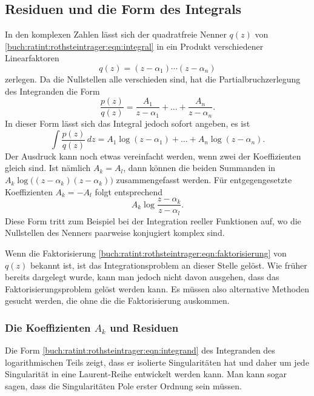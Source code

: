 %
%
\subsection{Residuen und die Form des Integrals
\label{buch:ratint:rothsteintrager:subsection:residuen}}
In den komplexen Zahlen lässt sich der quadratfreie Nenner $q(z)$ von
\eqref{buch:ratint:rothsteintrager:eqn:integral}
in ein Produkt verschiedener Linearfaktoren
\begin{equation}
q(z)
=
(z-\alpha_1)\cdots(z-\alpha_n)
\label{buch:ratint:rothsteintrager:eqn:faktorisierung}
\end{equation}
zerlegen.
Da die Nullstellen alle verschieden sind, hat die Partialbruchzerlegung
des Integranden die Form
\begin{equation}
\frac{p(z)}{q(z)}
=
\frac{A_1}{z-\alpha_1}
+
\ldots
+
\frac{A_n}{z-\alpha_n}.
\label{buch:ratint:rothsteintrager:eqn:integrand}
\end{equation}
In dieser Form lässt sich das Integral jedoch sofort angeben, es ist
\begin{equation}
\int
\frac{p(z)}{q(z)}
\,dz
=
A_1\log(z-\alpha_1)
+
\ldots
+
A_n\log(z-\alpha_n).
\label{buch:ratint:rothsteintrager:eqn:integralform}
\end{equation}
Der Ausdruck kann noch etwas vereinfacht werden, wenn zwei der
Koeffizienten gleich sind.
Ist nämlich $A_k=A_l$, dann können die beiden Summanden in
$A_k\log\bigl((z-\alpha_k)(z-\alpha_k)\bigr)$
zusammengefasst werden.
Für entgegengesetzte Koeffizienten $A_k=-A_l$ folgt entsprechend
\[
A_k\log \frac{z-\alpha_k}{z-\alpha_l}.
\]
Diese Form tritt zum Beispiel bei der Integration reeller Funktionen
auf, wo die Nullstellen des Nenners paarweise konjugiert komplex sind.

Wenn die Faktorisierung
\eqref{buch:ratint:rothsteintrager:eqn:faktorisierung}
von $q(z)$ bekannt ist, ist das Integrationsproblem an dieser
Stelle gelöst.
Wie früher bereits dargelegt wurde, kann man jedoch nicht davon
ausgehen, dass das Faktorisierungsproblem gelöst werden kann.
Es müssen also alternative Methoden gesucht werden, die ohne die 
die Faktorisierung auskommen.

%
%
\subsubsection{Die Koeffizienten $A_k$ und Residuen}
Die Form 
\eqref{buch:ratint:rothsteintrager:eqn:integrand}
des Integranden des logarithmischen Teils zeigt, dass er isolierte
Singularitäten hat und daher um jede Singularität in eine Laurent-Reihe
entwickelt werden kann.
%
Man kann sogar sagen, dass die Singularitäten Pole erster Ordnung
sein müssen.

